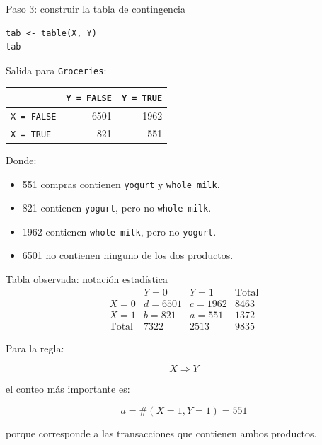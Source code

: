 \documentclass[10pt,aspectratio=169]{beamer}
\begin{document}
\begin{frame}[fragile]{Paso 3: construir la tabla de contingencia}
\begin{lstlisting}[style=Rstyle]
tab <- table(X, Y)
tab
\end{lstlisting}

\vspace{0.2cm}
Salida  para \texttt{Groceries}:

\begin{center}
\begin{tabular}{lrr}
\toprule
 & \texttt{Y = FALSE} & \texttt{Y = TRUE} \\
\midrule
\texttt{X = FALSE} & 6501 & 1962 \\
\texttt{X = TRUE}  & 821  & 551 \\
\bottomrule
\end{tabular}
\end{center}

\vspace{0.2cm}
Donde:

\begin{itemize}
  \item 551 compras contienen \texttt{yogurt} y \texttt{whole milk}.
  \item 821 contienen \texttt{yogurt}, pero no \texttt{whole milk}.
  \item 1962 contienen \texttt{whole milk}, pero no \texttt{yogurt}.
  \item 6501 no contienen ninguno de los dos productos.
\end{itemize}
\end{frame}

\begin{frame}{Tabla observada: notación estadística}
\Large
\[
\begin{array}{c|cc|c}
 & Y=0 & Y=1 & \text{Total} \\
\hline
X=0 & d=6501 & c=1962 & 8463 \\
X=1 & b=821  & a=551  & 1372 \\
\hline
\text{Total} & 7322 & 2513 & 9835
\end{array}
\]

\vspace{0.3cm}
\normalsize
Para la regla:

\[
X \Rightarrow Y
\]

el conteo más importante es:

\[
a = \#(X=1, Y=1) = 551
\]

porque corresponde a las transacciones que contienen ambos productos.
\end{frame}
\end{document}
